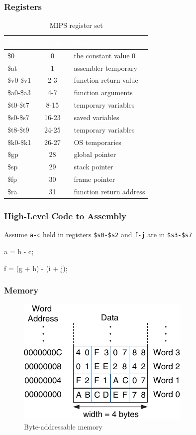 \documentclass[xcolor={table, dvipsnames}]{beamer}
\begin{document}
\begin{frame}
\frametitle{Registers}
\begin{table}[h!]
\centering
{
\begin{tabular}{ |p{3cm}| c |p{5cm}|  }
\hline
\rowcolor{NavyBlue}
\textcolor{white}{Name} & \textcolor{white}{Number} & \textcolor{white}{Use}  \\
\hline
\$0 & 0 & the constant value 0 \\
\$at & 1   & assembler temporary \\
\$v0-\$v1 & 2-3 & function return value \\
\$a0-\$a3    & 4-7 & function arguments \\
\$t0-\$t7 & 8-15 & temporary variables \\
\$s0-\$s7 & 16-23 & saved variables   \\
\$t8-\$t9 & 24-25 & temporary variables \\
\$k0-\$k1 & 26-27 & OS temporaries \\
\$gp & 28 & global pointer \\
\$sp & 29 & stack pointer \\
\$fp & 30 & frame pointer \\
\$ra & 31 & function return address \\
\hline
\end{tabular}
}
\caption{MIPS register set}
\end{table}
 \end{frame}
 
 \begin{frame}
 \frametitle{High-Level Code to Assembly}
 Assume \texttt{a-c} held in registers \texttt{\$s0-\$s2} and \texttt{f-j} are in \texttt{\$s3-\$s7} \newline
 
 \begin{example}
 a = b - c;
 
 f = (g + h) - (i + j);
 \end{example}
  
 \end{frame}
 
 \begin{frame}
 \frametitle{Memory}
 \begin{figure}
 \includegraphics{img/byte-address-memory.pdf}
 \caption{Byte-addressable memory}
 \end{figure}
 \end{frame}
\end{document}
